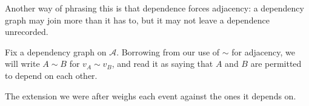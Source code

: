 Another way of phrasing this is that dependence forces adjacency: a dependency graph may join more than it has to, but it may not leave a dependence unrecorded.

\begin{boxlnotation}[Dependence]
    Fix a dependency graph on $\mathcal{A}$. Borrowing from our use of $\sim$ for adjacency, we will write $A \sim B$ for $v_A \sim v_B$, and read it as saying that $A$ and $B$ are permitted to depend on each other.
\end{boxlnotation}

The extension we were after weighs each event against the ones it depends on.

